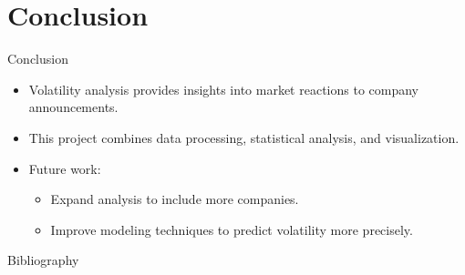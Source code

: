 \documentclass{beamer}
\begin{document}
\section{Conclusion}
\begin{frame}{Conclusion}
  \begin{itemize}
    \item Volatility analysis provides insights into market reactions to company announcements.
    \item This project combines data processing, statistical analysis, and visualization.
    \item Future work:
      \begin{itemize}
        \item Expand analysis to include more companies.
        \item Improve modeling techniques to predict volatility more precisely.
      \end{itemize}
  \end{itemize}
\end{frame}

\begin{frame}{Bibliography}
    
\end{frame}
\end{document}
